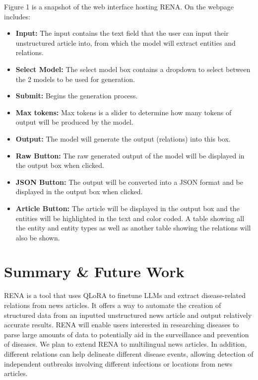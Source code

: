 \documentclass[letterpaper]{article} %
\begin{document}
Figure 1 is a snapshot of the web interface hosting RENA. On the webpage includes:
\begin{itemize}
    \item \textbf{Input:} The input contains the text field that the user can input their unstructured article into, from which the model will extract entities and relations.
    \item \textbf{Select Model:} The select model box contains a dropdown to select between the 2 models to be used for generation.
    \item \textbf{Submit:} Begins the generation process.
    \item \textbf{Max tokens:} Max tokens is a slider to determine how many tokens of output will be produced by the model.
    \item \textbf{Output:} The model will generate the output (relations) into this box.
    \item \textbf{Raw Button:} The raw generated output of the model will be displayed in the output box when clicked.
    \item \textbf{JSON Button:} The output will be converted into a JSON format and be displayed in the output box when clicked.
    \item \textbf{Article Button:} The article will be displayed in the output box and the entities will be highlighted in the text and color coded. A table showing all the entity and entity types as well as another table showing the relations will also be shown. 
\end{itemize}


\section{Summary \& Future Work}
RENA is a tool that uses QLoRA to finetune LLMs and extract disease-related relations from news articles. It offers a way to automate the creation of structured data from an inputted unstructured news article and output relatively accurate results. RENA will enable users interested in researching diseases to parse large amounts of data to potentially aid in the surveillance and prevention of diseases. We plan to extend RENA to multilingual news articles. In addition, different relations can help delineate different disease events, allowing detection of independent outbreaks involving different infections or locations from news articles.  

\end{document}
